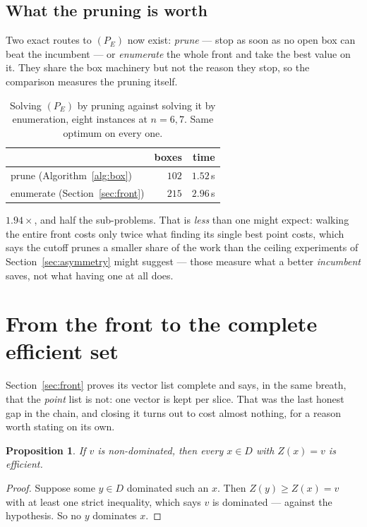 \documentclass[11pt,a4paper]{article}
\newtheorem{proposition}{Proposition}
\newcommand{\Z}{Z}
\newcommand{\Dset}{D}
\begin{document}
\subsection{What the pruning is worth}

Two exact routes to $(P_E)$ now exist: \emph{prune} --- stop as soon as no open
box can beat the incumbent --- or \emph{enumerate} the whole front and take the
best value on it.  They share the box machinery but not the reason they stop,
so the comparison measures the pruning itself.

\begin{table}[h]
\centering
\caption{Solving $(P_E)$ by pruning against solving it by enumeration, eight
instances at $n = 6, 7$.  Same optimum on every one.}
\begin{tabular}{lrr}
\toprule
 & boxes & time \\
\midrule
prune (Algorithm~\ref{alg:box})      & $102$ & $1.52$\,s \\
enumerate (Section~\ref{sec:front})  & $215$ & $2.96$\,s \\
\bottomrule
\end{tabular}
\end{table}

\noindent
$1.94\times$, and half the sub-problems.  That is \emph{less} than one might
expect: walking the entire front costs only twice what finding its single best
point costs, which says the cutoff prunes a smaller share of the work than the
ceiling experiments of Section~\ref{sec:asymmetry} might suggest --- those
measure what a better \emph{incumbent} saves, not what having one at all does.

\section{From the front to the complete efficient set}
\label{sec:complete}

Section~\ref{sec:front} proves its vector list complete and says, in the same
breath, that the \emph{point} list is not: one vector is kept per slice.  That
was the last honest gap in the chain, and closing it turns out to cost almost
nothing, for a reason worth stating on its own.

\begin{proposition}\label{prop:slice}
If $v$ is non-dominated, then \emph{every} $x \in \Dset$ with $\Z(x) = v$ is
efficient.
\end{proposition}

\begin{proof}
Suppose some $y \in \Dset$ dominated such an $x$.  Then
$\Z(y) \geqslant \Z(x) = v$ with at least one strict inequality, which says $v$
is dominated --- against the hypothesis.  So no $y$ dominates $x$.
\end{proof}
\end{document}
